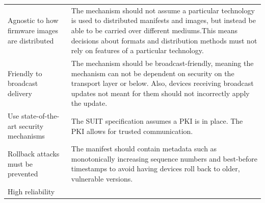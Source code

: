 \documentclass[0-thesis.tex]{subfiles}
\begin{document}
\begin{small}
\begin{longtable}[]{@{}ll@{}}
        \begin{minipage}[t]{0.41\columnwidth}\raggedright\strut
        Agnostic to how firmware images are distributed\strut
        \end{minipage} & \begin{minipage}[t]{0.53\columnwidth}\raggedright\strut
        The mechanism should not assume a particular technology is used to
        distributed manifests and images, but instead be able to be carried over
        different mediums.This means decisions about formats and distribution
        methods must not rely on features of a particular technology.\strut
        \end{minipage}\tabularnewline
        \begin{minipage}[t]{0.41\columnwidth}\raggedright\strut
        Friendly to broadcast delivery\strut
        \end{minipage} & \begin{minipage}[t]{0.53\columnwidth}\raggedright\strut
        The mechanism should be broadcast-friendly, meaning the mechanism can
        not be dependent on security on the transport layer or below. Also,
        devices receiving broadcast updates not meant for them should not
        incorrectly apply the update.\strut
        \end{minipage}\tabularnewline
        \begin{minipage}[t]{0.41\columnwidth}\raggedright\strut
        Use state-of-the-art security mechanisms\strut
        \end{minipage} & \begin{minipage}[t]{0.53\columnwidth}\raggedright\strut
        The SUIT specification assumes a PKI is in place. The PKI allows for
        trusted communication.\strut
        \end{minipage}\tabularnewline
        \begin{minipage}[t]{0.41\columnwidth}\raggedright\strut
        Rollback attacks must be prevented\strut
        \end{minipage} & \begin{minipage}[t]{0.53\columnwidth}\raggedright\strut
        The manifest should contain metadata such as monotonically increasing
        sequence numbers and best-before timestamps to avoid having devices roll back
        to older, vulnerable versions.\strut
        \end{minipage}\tabularnewline
        \begin{minipage}[t]{0.41\columnwidth}\raggedright\strut
        High reliability\strut

\end{minipage}
\end{longtable}
\end{small}
\end{document}
